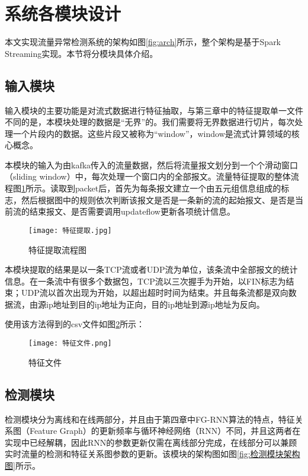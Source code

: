 \section{系统各模块设计}
本文实现流量异常检测系统的架构如图\ref{fig:arch}所示，整个架构是基于Spark Streaming实现。本节将分模块具体介绍。
\subsection{输入模块}
输入模块的主要功能是对流式数据进行特征抽取，与第三章中的特征提取单一文件不同的是，本模块处理的数据是“无界”的。我们需要将无界数据进行切片，每次处理一个片段内的数据。这些片段又被称为“window”，window是流式计算领域的核心概念。

本模块的输入为由kafka传入的流量数据，然后将流量报文划分到一个个滑动窗口（sliding window）中，每次处理一个窗口内的全部报文。流量特征提取的整体流程图\ref{fig:特征提取}所示。读取到packet后，首先为每条报文建立一个由五元组信息组成的标志，然后根据图中的规则依次判断该报文是否是一条新的流的起始报文、是否是当前流的结束报文、是否需要调用updateflow更新各项统计信息。

\begin{figure}
  \centering
  \texttt{[image: 特征提取.jpg]}
  \caption{特征提取流程图}
  \label{fig:特征提取}
\end{figure}

本模块提取的结果是以一条TCP流或者UDP流为单位，该条流中全部报文的统计信息。在一条流中有很多个数据包，TCP流以三次握手为开始，以FIN标志为结束；UDP流以首次出现为开始，以超出超时时间为结束。并且每条流都是双向数据流，由源ip地址到目的ip地址为正向，目的ip地址到源ip地址为反向。

使用该方法得到的csv文件如图\ref{fig:特征文件}所示：
\begin{figure}
    \centering
    \texttt{[image: 特征文件.png]}
    \caption{特征文件}
    \label{fig:特征文件}
  \end{figure}


\subsection{检测模块}
检测模块分为离线和在线两部分，并且由于第四章中FG-RNN算法的特点，特征关系图（Feature Graph）的更新频率与循环神经网络（RNN）不同，并且这两者在实现中已经解耦，因此RNN的参数更新仅需在离线部分完成，在线部分可以兼顾实时流量的检测和特征关系图参数的更新。该模块的架构图如图\ref{fig:检测模块架构图}所示。


